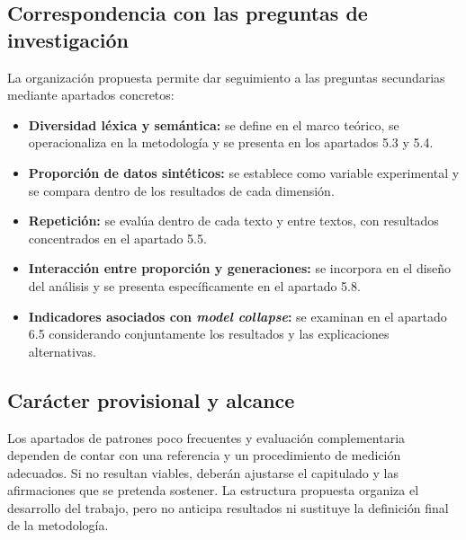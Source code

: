 \documentclass[12pt,letterpaper]{article}
\begin{document}
\subsection*{Correspondencia con las preguntas de investigación}
La organización propuesta permite dar seguimiento a las preguntas
secundarias mediante apartados concretos:
\begin{itemize}[leftmargin=0.7cm,itemsep=4pt]
\item \textbf{Diversidad léxica y semántica:} se define en el marco teórico,
se operacionaliza en la metodología y se presenta en los apartados 5.3 y 5.4.
\item \textbf{Proporción de datos sintéticos:} se establece como variable
experimental y se compara dentro de los resultados de cada dimensión.
\item \textbf{Repetición:} se evalúa dentro de cada texto y entre textos,
con resultados concentrados en el apartado 5.5.
\item \textbf{Interacción entre proporción y generaciones:} se incorpora
en el diseño del análisis y se presenta específicamente en el apartado 5.8.
\item \textbf{Indicadores asociados con \textit{model collapse}:} se examinan
en el apartado 6.5 considerando conjuntamente los resultados y las
explicaciones alternativas.
\end{itemize}

\subsection*{Carácter provisional y alcance}
Los apartados de patrones poco frecuentes y evaluación complementaria
dependen de contar con una referencia y un procedimiento de medición
adecuados. Si no resultan viables, deberán ajustarse el capitulado y las
afirmaciones que se pretenda sostener. La estructura propuesta organiza el
desarrollo del trabajo, pero no anticipa resultados ni sustituye la definición
final de la metodología.
\end{document}
